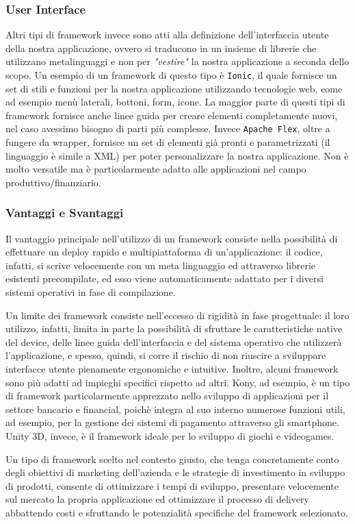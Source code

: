 \subsubsection{User Interface}
Altri tipi di framework invece sono atti alla definizione dell'interfaccia utente della nostra applicazione, ovvero si traducono in un insieme di librerie che utilizzano metalinguaggi e non per \emph{"vestire"} la nostra applicazione a seconda dello scopo.
Un esempio di un framework di questo tipo è \texttt{Ionic}, il quale fornisce un set di stili e funzioni per la nostra applicazione utilizzando tecnologie web, come ad esempio menù laterali, bottoni, form, icone. La maggior parte di questi tipi di framework fornisce anche linee guida per creare elementi completamente nuovi, nel caso avessimo bisogno di parti più complesse.
Invece \texttt{Apache Flex}, oltre a fungere da wrapper, fornisce un set di elementi già pronti e parametrizzati (il linguaggio è simile a XML) per poter personalizzare la nostra applicazione. Non è molto versatile ma è particolarmente adatto alle applicazioni nel campo produttivo/finanziario.
\subsubsection{Vantaggi e Svantaggi}
Il vantaggio principale nell’utilizzo di un framework consiste nella possibilità di effettuare un deploy rapido e multipiattaforma di un’applicazione: il codice, infatti, si scrive velocemente con un meta linguaggio ed attraverso librerie esistenti precompilate, ed esso viene automaticamente adattato per i diversi sistemi operativi in fase di compilazione.

Un limite dei framework consiste nell’eccesso di rigidità in fase progettuale: il loro utilizzo, infatti, limita in parte la possibilità di sfruttare le caratteristiche native del device, delle linee guida dell’interfaccia e del sistema operativo che utilizzerà l’applicazione, e spesso, quindi, si corre il rischio di non riuscire a sviluppare interfacce utente pienamente ergonomiche e intuitive.
Inoltre, alcuni framework sono più adatti ad impieghi specifici rispetto ad altri. Kony, ad esempio, è un tipo di framework particolarmente apprezzato nello sviluppo di applicazioni per il settore bancario e financial, poichè integra al suo interno numerose funzioni utili, ad esempio, per la gestione dei sistemi di pagamento attraverso gli smartphone. Unity 3D, invece, è il framework ideale per lo sviluppo di giochi e videogames.

Un tipo di framework scelto nel contesto giusto, che tenga concretamente conto degli obiettivi di marketing dell’azienda e le strategie di investimento in sviluppo di prodotti, consente di ottimizzare i tempi di sviluppo, presentare velocemente sul mercato la propria applicazione ed ottimizzare il processo di delivery abbattendo costi e sfruttando le potenzialità specifiche del framework selezionato.

